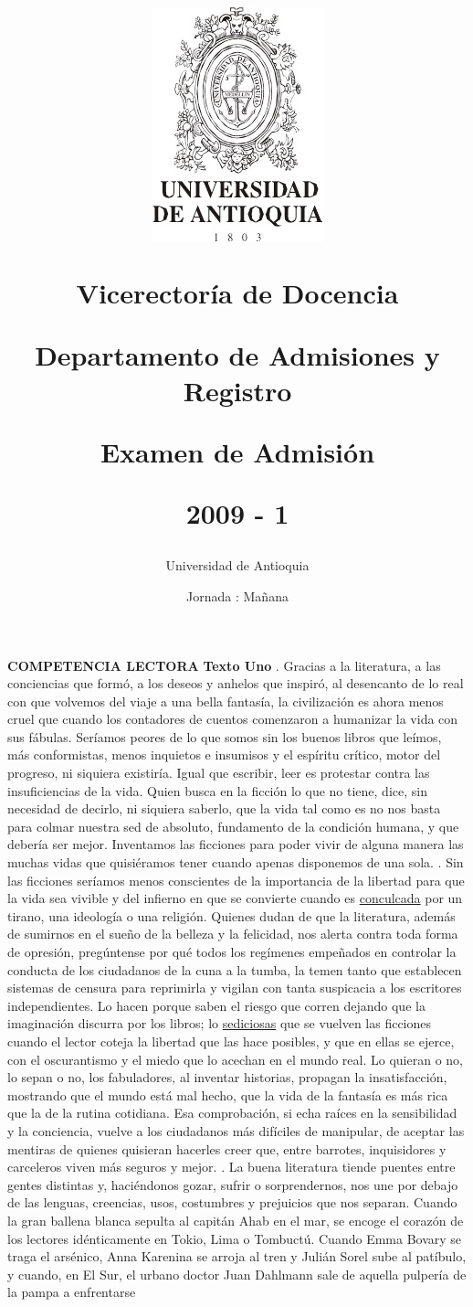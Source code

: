 \documentclass[a4paper,10pt]{article}
\title{ 
\begin{minipage}{12cm} 
\centerline {\includegraphics{../../escudo.jpg}} 
\begin{center}Vicerector\'ia de Docencia\end{center}Departamento de Admisiones y Registro\newline\newline\newline\newline\centerline {Examen de Admisi\'on}\newline\newline\centerline {2009 - 1}\date{Jornada :  Mañana}\author{Universidad de Antioquia}\end{minipage}}
\begin{document}
\maketitle
\twocolumn 
\newpage 
\noindent 
\textbf{ COMPETENCIA LECTORA } \newline \textbf{ Texto Uno} . Gracias a la literatura, a las conciencias que formó, a los deseos y anhelos que inspiró, al desencanto de lo real con que volvemos del viaje a una bella fantasía, la civilización es ahora menos cruel que cuando los contadores de cuentos comenzaron a humanizar la vida con sus fábulas. Seríamos peores de lo que somos sin los buenos libros que leímos, más conformistas, menos inquietos e insumisos y el espíritu crítico, motor del progreso, ni siquiera existiría. Igual que escribir, leer es protestar contra las insuficiencias de la vida. Quien busca en la ficción lo que no tiene, dice, sin necesidad de decirlo, ni siquiera saberlo, que la vida tal como es no nos basta para colmar nuestra sed de absoluto, fundamento de la condición humana, y que debería ser mejor. Inventamos las ficciones para poder vivir de alguna manera las muchas vidas que quisiéramos tener cuando apenas disponemos de una sola. . Sin las ficciones seríamos menos conscientes de la importancia de la libertad para que la vida sea vivible y del infierno en que se convierte cuando es \underline{ conculcada}  por un tirano, una ideología o una religión. Quienes dudan de que la literatura, además de sumirnos en el sueño de la belleza y la felicidad, nos alerta contra toda forma de opresión, pregúntense por qué todos los regímenes empeñados en controlar la conducta de los ciudadanos de la cuna a la tumba, la temen tanto que establecen sistemas de censura para reprimirla y vigilan con tanta suspicacia a los escritores independientes. Lo hacen porque saben el riesgo que corren dejando que la imaginación discurra por los libros; lo \underline{ sediciosas}  que se vuelven las ficciones cuando el lector coteja la libertad que las hace posibles, y que en ellas se ejerce, con el oscurantismo y el miedo que lo acechan en el mundo real. Lo quieran o no, lo sepan o no, los fabuladores, al inventar historias, propagan la insatisfacción, mostrando que el mundo está mal hecho, que la vida de la fantasía es más rica que la de la rutina cotidiana. Esa comprobación, si echa raíces en la sensibilidad y la conciencia, vuelve a los ciudadanos más difíciles de manipular, de aceptar las mentiras de quienes quisieran hacerles creer que, entre barrotes, inquisidores y carceleros viven más seguros y mejor. . La buena literatura tiende puentes entre gentes distintas y, haciéndonos gozar, sufrir o sorprendernos, nos une por debajo de las lenguas, creencias, usos, costumbres y prejuicios que nos separan. Cuando la gran ballena blanca sepulta al capitán Ahab en el mar, se encoge el corazón de los lectores idénticamente en Tokio, Lima o Tombuctú. Cuando Emma Bovary se traga el arsénico, Anna Karenina se arroja al tren y Julián Sorel sube al patíbulo, y cuando, en El Sur, el urbano doctor Juan Dahlmann sale de aquella pulpería de la pampa a enfrentarse 
\end{document}
